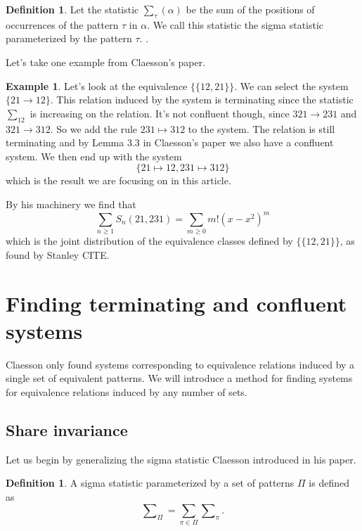 \documentclass[a4paper, 11pt, english]{article}
\newcommand{\patternrule}{ \mapsto \!}
\theoremstyle{definition}
\newtheorem{definition}[theorem]{Definition}
\newtheorem{example}[theorem]{Example}
\newcommand{\Sym}{S}
\begin{document}
\begin{definition}
    Let the statistic $\sum_\tau(\alpha)$ be the sum of the positions of occurrences of
    the pattern $\tau$ in $\alpha$. We call this statistic the sigma statistic
    parameterized by the pattern $\tau$.
    \cite{claesson:2021}.
\end{definition}


Let's take one example from Claesson's paper.
\begin{example}
    Let's look at the equivalence $\{ \{ 12, 21 \} \}$. We can select the system $\{
        21 \to 12 \}$. This relation induced by the system is terminating since the statistic
    $\sum_{12}$ is increasing on the relation. It's not
    confluent though, since $321 \to 231$ and $321 \to 312$. So we add the rule
    $231 \patternrule 312$ to the system. The relation is still terminating and by Lemma
    3.3 in Claesson's paper we also have a confluent system. We then end up with
    the system 
    \[
        \{ 21 \patternrule 12, 231 \patternrule 312 \}
    \]
    which is the result we are focusing on in this article.

    By his machinery we find that 
    \[
        \sum_{n \geq 1} \Sym_n(21, 231) = \sum_{m \geq 0} m!(x-x^2)^m
    \]
    which is the joint distribution of the equivalence classes defined by 
    $\{ \{ 12, 21 \} \}$, as found by Stanley CITE.
\end{example}

\section{Finding terminating and confluent systems}
Claesson only found systems corresponding to equivalence relations induced by a
single set of equivalent patterns. We will introduce a method for finding
systems for equivalence relations induced by any number of sets.

\subsection{Share invariance}
Let us begin by generalizing the sigma statistic Claesson introduced in his paper.

\begin{definition}
    A sigma statistic parameterized by a set of patterns $\Pi$ is defined as
    $$
        \sum\nolimits_\Pi = \sum_{\pi \in \Pi} \sum\nolimits_{\pi}.
    $$
\end{definition}
\end{document}
